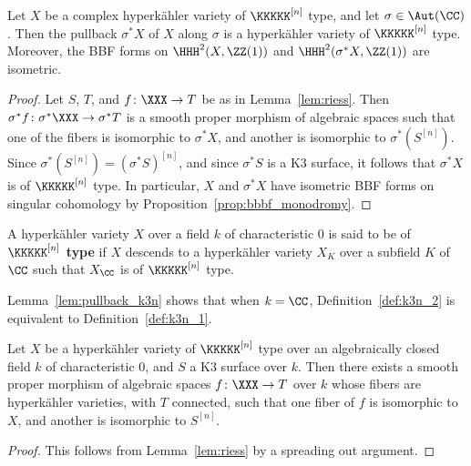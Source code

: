 \begin{lemma}\label{lem:pullback_k3n}
    Let $X$ be a complex hyperk\"ahler variety of $\KKKKK^{[n]}$ type, and let $\sigma \in \Aut(\CC)$. Then the pullback $\sigma^* X$ of $X$ along $\sigma$ is a hyperk\"ahler variety of $\KKKKK^{[n]}$ type. Moreover, the BBF forms on $\HHH^2(X,\ZZ(1))$ and $\HHH^2(\sigma^* X,\ZZ(1))$ are isometric.
\end{lemma}
\begin{proof}
    Let $S$, $T$, and $f\colon \XXX \rightarrow T$ be as in Lemma~\ref{lem:riess}. Then $\sigma^*f\colon \sigma^* \XXX \rightarrow \sigma^* T$ is a smooth proper morphism of algebraic spaces such that one of the fibers is isomorphic to $\sigma^* X$, and another is isomorphic to $\sigma^*(S^{[n]})$. Since $\sigma^*(S^{[n]}) = (\sigma^* S)^{[n]}$, and since $\sigma^* S$ is a K3 surface, it follows that $\sigma^* X$ is of $\KKKKK^{[n]}$ type. In particular, $X$ and $\sigma^* X$ have isometric BBF forms on singular cohomology by Proposition~\ref{prop:bbbf_monodromy}.
\end{proof}

\begin{definition}\label{def:k3n_2}
    A hyperk\"ahler variety $X$ over a field $k$ of characteristic $0$ is said to be of {\bfseries $\KKKKK^{[n]}$ type} if $X$ descends to a hyperk\"ahler variety $X_K$ over a subfield $K$ of $\CC$ such that $X_{\CC}$ is of $\KKKKK^{[n]}$ type.
\end{definition}

\begin{remark}
Lemma~\ref{lem:pullback_k3n} shows that when $k = \CC$, Definition~\ref{def:k3n_2} is equivalent to Definition~\ref{def:k3n_1}.
\end{remark}

\begin{lemma}\label{lem:riess_general}
    Let $X$ be a hyperk\"ahler variety of $\KKKKK^{[n]}$ type over an algebraically closed field $k$ of characteristic $0$, and $S$ a K3 surface over $k$. Then there exists a smooth proper morphism of algebraic spaces $f\colon \XXX \rightarrow T$ over $k$ whose fibers are hyperk\"ahler varieties, with $T$ connected, such that one fiber of $f$ is isomorphic to $X$, and another is isomorphic to $S^{[n]}$.
\end{lemma}
\begin{proof}
This follows from Lemma~\ref{lem:riess} by a spreading out argument.
\end{proof}

